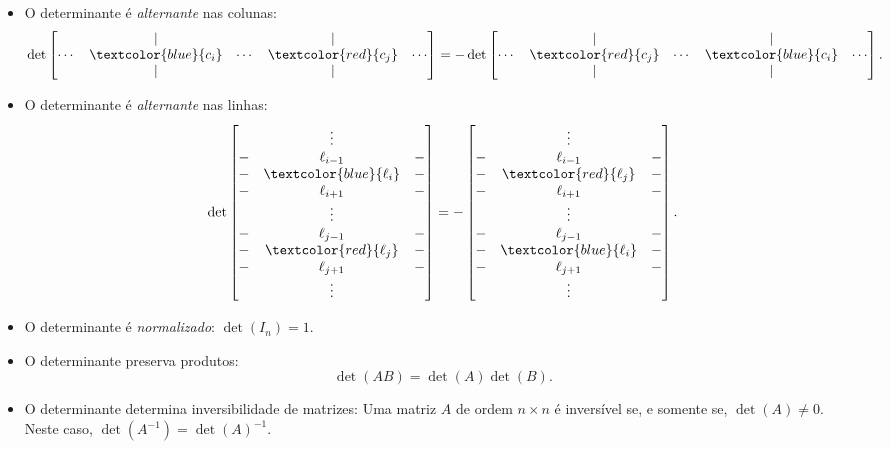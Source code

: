 \begin{itemize}
	\item O determinante é \textit{alternante} nas colunas:	
	\[\det\begin{bmatrix}&|&&|&\\
	\cdots &\textcolor{blue}{c_i}&\cdots&\textcolor{red}{c_j}&\cdots\\&|&&|&\end{bmatrix}=-\det\begin{bmatrix}&|&&|&\\
	\cdots&\textcolor{red}{c_j}&\cdots&\textcolor{blue}{c_i}&\cdots\\&|&&|&\end{bmatrix}.\]
	
	\item O determinante é \textit{alternante} nas linhas:
	\[\det\begin{bmatrix}&\vdots&\\
	-&\ell_{i-1}&-\\
	-&\textcolor{blue}{\ell_i}&-\\
	-&\ell_{i+1}&-\\
	&\vdots&\\
	-&\ell_{j-1}&-\\
	-&\textcolor{red}{\ell_j}&-\\
	-&\ell_{j+1}&-\\
	&\vdots&\end{bmatrix}=-\begin{bmatrix}&\vdots&\\
	-&\ell_{i-1}&-\\
	-&\textcolor{red}{\ell_j}&-\\
	-&\ell_{i+1}&-\\
	&\vdots&\\
	-&\ell_{j-1}&-\\
	-&\textcolor{blue}{\ell_i}&-\\
	-&\ell_{j+1}&-\\
	&\vdots&\end{bmatrix}.\]
	
	\item O determinante é \textit{normalizado}: $\det(I_n)=1$.
		
	\item O determinante preserva produtos:
	\[\det(AB)=\det(A)\det(B).\]
	
	\item O determinante determina inversibilidade de matrizes: Uma matriz $A$ de ordem $n\times n$ é inversível se, e somente se, $\det(A)\neq 0$. Neste caso, $\det(A^{-1})=\det(A)^{-1}$.
	

\end{itemize}
